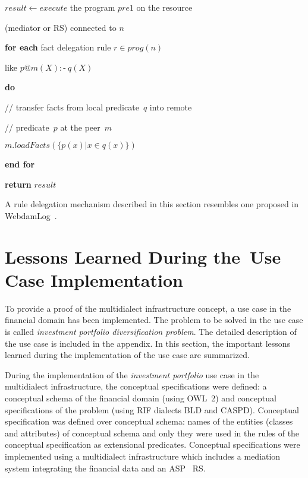 \begin{multicols}{2}
  \noindent
  $result \leftarrow execute$ the program $pre1$ on the resource 
  
  (mediator or RS)   connected to $n$

  \noindent
  \textbf{for each} fact delegation rule $r \in  prog(n)$
  
   like   $p@m(X):\!\mbox{-}\ q(X)$
   
   \noindent
   \textbf{do}

  \hspace*{1mm}// transfer facts from local predicate~$q$ into remote
  
  
\hspace*{1mm}// predicate~$p$ at the peer~$m$

  \hspace*{1mm}$m.loadFacts(\{ p(x) \vert x \in  q(x)\})$

\noindent
  \textbf{end for}

\noindent
  \textbf{return} $result$

  \smallskip

  A rule delegation mechanism described in this section resembles one proposed in
WebdamLog~\cite{30-kal}.

\section{Lessons Learned During the~Use Case Implementation }

\noindent
  To provide a proof of the multidialect infrastructure concept, a use case in the
financial domain has been implemented. The problem to be solved in the use case is
called \textit{investment portfolio diversification problem}. The detailed description
of the use case is included in the appendix. In this section, the important lessons
learned during the implementation of the use case are summarized.

  During the implementation of the \textit{investment portfolio} use case in the
multidialect infrastructure, the conceptual specifications were defined: a conceptual
schema of the financial domain (using OWL~2) and conceptual specifications of the
problem (using RIF dialects BLD and CASPD). Conceptual specification was defined over conceptual schema:
names of the entities (classes and attributes) of conceptual schema and only they were used in the
rules of the conceptual specification as extensional predicates.
Conceptual specifications were
implemented using a multidialect infrastructure which includes a mediation system
integrating the financial data and an ASP~\cite{26-kal} RS.


\end{multicols}
